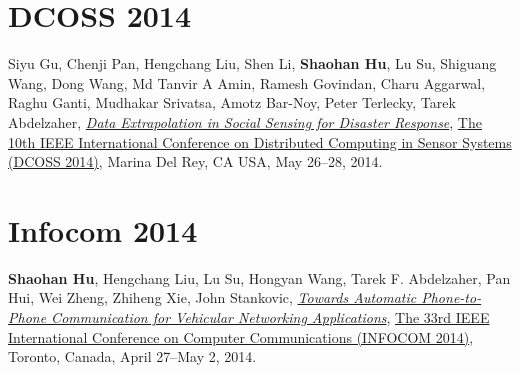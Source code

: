 \section{\sc DCOSS 2014}\hypertarget{gu2014dcoss}{}
Siyu Gu, Chenji Pan, Hengchang Liu, Shen Li, \textbf{Shaohan Hu}, Lu Su, Shiguang Wang, Dong Wang, Md Tanvir A Amin, Ramesh Govindan, Charu Aggarwal, Raghu Ganti, Mudhakar Srivatsa, Amotz Bar-Noy, Peter Terlecky, Tarek Abdelzaher,
\href{http://ieeexplore.ieee.org/document/6846153}{\emph{Data Extrapolation in Social Sensing for Disaster Response}},
\href{http://www.dcoss.org/dcoss14/}{\textsf{The 10th IEEE International Conference on Distributed Computing in Sensor Systems (DCOSS 2014)}},
Marina Del Rey, CA USA, May 26--28, 2014.


\section{\sc Infocom 2014}\hypertarget{hu2014infocom}{}
\textbf{Shaohan Hu}, Hengchang Liu, Lu Su, Hongyan Wang, Tarek F. Abdelzaher, Pan Hui, Wei Zheng, Zhiheng Xie, John Stankovic,
\href{http://ieeexplore.ieee.org/document/6848113}{\emph{Towards Automatic Phone-to-Phone Communication for Vehicular Networking Applications}},
\href{http://infocom2014.ieee-infocom.org}{\textsf{The 33rd IEEE International Conference on Computer Communications (INFOCOM 2014)}},
Toronto, Canada, April 27--May 2, 2014.


